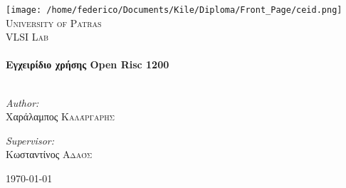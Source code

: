 \begin{titlepage}

\begin{center}


\texttt{[image: /home/federico/Documents/Kile/Diploma/Front\_Page/ceid.png]}\\[1cm]    
\textsc{\LARGE University of Patras}\\[1.5cm]

\textsc{\Large VLSI Lab}\\[0.5cm]


\HRule \\[0.4cm]
{ \huge \bfseries Εγχειρίδιο χρήσης Open Risc 1200 }\\[0.4cm]

\HRule \\[1.5cm]

\begin{minipage}{0.4\textwidth}
\begin{flushleft} \large
\emph{Author:}\\
Χαράλαμπος \textsc{Καλάργαρης}
\end{flushleft}
\end{minipage}
\begin{minipage}{0.4\textwidth}
\begin{flushright} \large
\emph{Supervisor:} \\
Κωσταντίνος \textsc{Αδαός}
\end{flushright}
\end{minipage}

\vfill

{\large \today}

\end{center}

\end{titlepage}